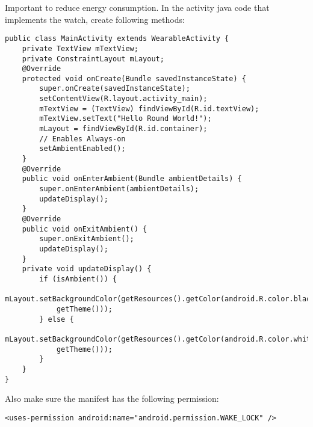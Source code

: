 \documentclass[11pt]{article}
\begin{document}
Important to reduce energy consumption. In the activity java code that implements the watch, create following methods: 
\lstset{language = Java}
\begin{lstlisting}
public class MainActivity extends WearableActivity {
    private TextView mTextView;
    private ConstraintLayout mLayout;
    @Override
    protected void onCreate(Bundle savedInstanceState) {
        super.onCreate(savedInstanceState);
        setContentView(R.layout.activity_main);
        mTextView = (TextView) findViewById(R.id.textView);
        mTextView.setText("Hello Round World!");
        mLayout = findViewById(R.id.container);
        // Enables Always-on
        setAmbientEnabled();
    }
    @Override
    public void onEnterAmbient(Bundle ambientDetails) {
        super.onEnterAmbient(ambientDetails);
        updateDisplay();
    }
    @Override
    public void onExitAmbient() {
        super.onExitAmbient();
        updateDisplay();
    }
    private void updateDisplay() {
        if (isAmbient()) {
            mLayout.setBackgroundColor(getResources().getColor(android.R.color.black,
            getTheme()));
        } else {
            mLayout.setBackgroundColor(getResources().getColor(android.R.color.white,
            getTheme()));
        }
    }
}
\end{lstlisting}
Also make sure the manifest has the following permission:
\lstset{language = XML}
\begin{lstlisting}
<uses-permission android:name="android.permission.WAKE_LOCK" />
\end{lstlisting}
\end{document}
